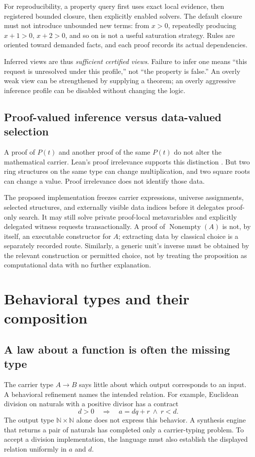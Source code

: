 \documentclass[11pt,letterpaper]{article}
\newcommand{\code}[1]{\texttt{\detokenize{#1}}}
\newcommand{\N}{\mathbb N}
\theoremstyle{definition}
\theoremstyle{remark}
\begin{document}
For reproducibility, a property query first uses exact local evidence, then
registered bounded closure, then explicitly enabled solvers. The default closure
must not introduce unbounded new terms: from $x>0$, repeatedly producing
$x+1>0$, $x+2>0$, and so on is not a useful saturation strategy. Rules are
oriented toward demanded facts, and each proof records its actual dependencies.

Inferred views are thus \emph{sufficient certified views}. Failure to infer one
means ``this request is unresolved under this profile,'' not ``the property is
false.'' An overly weak view can be strengthened by supplying a theorem; an
overly aggressive inference profile can be disabled without changing the logic.

\subsection{Proof-valued inference versus data-valued selection}
A proof of $P(t)$ and another proof of the same $P(t)$ do not alter the
mathematical carrier. Lean's proof irrelevance supports this distinction
\cite{lean-subtypes,lean-types}. But two ring structures on the same type can
change multiplication, and two square roots can change a value. Proof
irrelevance does not identify those data.

The proposed implementation freezes carrier expressions, universe assignments,
selected structures, and externally visible data indices before it delegates
proof-only search. It may still solve private proof-local metavariables and
explicitly delegated witness requests transactionally. A proof of
$\operatorname{Nonempty}(A)$ is not, by itself, an executable constructor for
$A$; extracting data by classical choice is a separately recorded route.
Similarly, a generic unit's inverse must be obtained by the relevant
construction or permitted choice, not by treating the \code{IsUnit} proposition
as computational data with no further explanation.

\section{Behavioral types and their composition}\label{sec:behavior}

\subsection{A law about a function is often the missing type}
The carrier type $A\to B$ says little about which output corresponds to an
input. A behavioral refinement names the intended relation. For example,
Euclidean division on naturals with a positive divisor has a contract
\[
 d>0\quad\Longrightarrow\quad
 a=dq+r\ \wedge\ r<d.
\]
The output type $\N\times\N$ alone does not express this behavior. A synthesis
engine that returns a pair of naturals has completed only a carrier-typing
problem. To accept a division implementation, the language must also establish
the displayed relation uniformly in $a$ and $d$.
\end{document}
